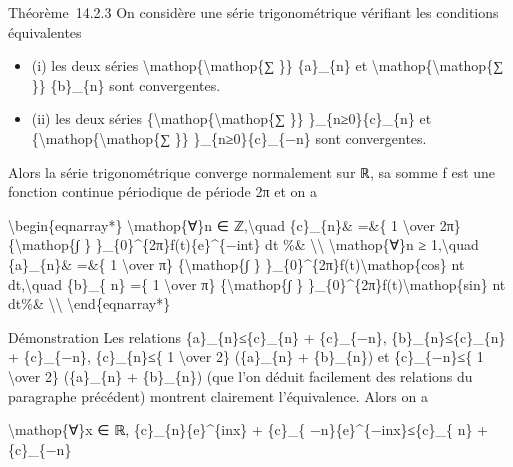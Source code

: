 \documentclass[]{article}
\begin{document}
Théorème~14.2.3 On considère une série trigonométrique vérifiant les
conditions équivalentes

\begin{itemize}
\itemsep1pt\parskip0pt
\item
  (i) les deux séries \textbackslash{}mathop\{\textbackslash{}mathop\{∑
  \}\} \textbar{}\{a\}\_\{n\}\textbar{} et
  \textbackslash{}mathop\{\textbackslash{}mathop\{∑ \}\}
  \textbar{}\{b\}\_\{n\}\textbar{} sont convergentes.
\item
  (ii) les deux séries
  \{\textbackslash{}mathop\{\textbackslash{}mathop\{∑ \}\}
  \}\_\{n≥0\}\textbar{}\{c\}\_\{n\}\textbar{} et
  \{\textbackslash{}mathop\{\textbackslash{}mathop\{∑ \}\}
  \}\_\{n≥0\}\textbar{}\{c\}\_\{−n\}\textbar{} sont convergentes.
\end{itemize}

Alors la série trigonométrique converge normalement sur ℝ, sa somme f
est une fonction continue périodique de période 2π et on a

\textbackslash{}begin\{eqnarray*\} \textbackslash{}mathop\{∀\}n ∈
ℤ,\textbackslash{}quad \{c\}\_\{n\}\& =\&\{ 1 \textbackslash{}over 2π\}
\{\textbackslash{}mathop\{∫ \} \}\_\{0\}\^{}\{2π\}f(t)\{e\}\^{}\{−int\}
dt \%\& \textbackslash{}\textbackslash{} \textbackslash{}mathop\{∀\}n ≥
1,\textbackslash{}quad \{a\}\_\{n\}\& =\&\{ 1 \textbackslash{}over π\}
\{\textbackslash{}mathop\{∫ \}
\}\_\{0\}\^{}\{2π\}f(t)\textbackslash{}mathop\{cos\} nt
dt,\textbackslash{}quad \{b\}\_\{ n\} =\{ 1 \textbackslash{}over π\}
\{\textbackslash{}mathop\{∫ \}
\}\_\{0\}\^{}\{2π\}f(t)\textbackslash{}mathop\{sin\} nt dt\%\&
\textbackslash{}\textbackslash{} \textbackslash{}end\{eqnarray*\}

Démonstration Les relations
\textbar{}\{a\}\_\{n\}\textbar{}≤\textbar{}\{c\}\_\{n\}\textbar{} +
\textbar{}\{c\}\_\{−n\}\textbar{},
\textbar{}\{b\}\_\{n\}\textbar{}≤\textbar{}\{c\}\_\{n\}\textbar{} +
\textbar{}\{c\}\_\{−n\}\textbar{}, \textbar{}\{c\}\_\{n\}\textbar{}≤\{ 1
\textbackslash{}over 2\} (\textbar{}\{a\}\_\{n\}\textbar{} +
\textbar{}\{b\}\_\{n\}\textbar{}) et
\textbar{}\{c\}\_\{−n\}\textbar{}≤\{ 1 \textbackslash{}over 2\}
(\textbar{}\{a\}\_\{n\}\textbar{} + \textbar{}\{b\}\_\{n\}\textbar{})
(que l'on déduit facilement des relations du paragraphe précédent)
montrent clairement l'équivalence. Alors on a

\textbackslash{}mathop\{∀\}x ∈ ℝ, \textbar{}\{c\}\_\{n\}\{e\}\^{}\{inx\}
+ \{c\}\_\{ −n\}\{e\}\^{}\{−inx\}\textbar{}≤\textbar{}\{c\}\_\{
n\}\textbar{} + \textbar{}\{c\}\_\{−n\}\textbar{}
\end{document}
